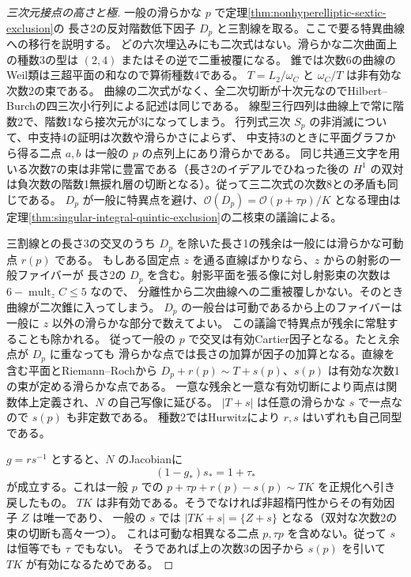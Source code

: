 \begin{proof}[三次元接点の高さと極]
一般の滑らかな $p$ で定理\ref{thm:nonhyperelliptic-sextic-exclusion}の
長さ2の反対階数低下因子 $D_p$ と三割線を取る。ここで要る特異曲線への移行を説明する。
どの六次埋込みにも二次式はない。滑らかな二次曲面上の種数3の型は $(2,4)$ またはその逆で二重被覆になる。
錐では次数6の曲線のWeil類は三超平面の和なので算術種数4である。
$T=L_2/\omega_C$ と $\omega_C/T$ は非有効な次数2の束である。
曲線の二次式がなく、全二次切断が十次元なのでHilbert--Burchの四三次小行列による記述は同じである。
線型三行四列は曲線上で常に階数2で、階数1なら接次元が3になってしまう。
行列式三次 $S_p$ の非消滅について、中支持4の証明は次数や滑らかさによらず、
中支持3のときに平面グラフから得る二点 $a,b$ は一般の $p$ の点列上にあり滑らかである。
同じ共通三文字を用いる次数7の束は非常に豊富である（長さ2のイデアルでひねった後の
$H^1$ の双対は負次数の階数1無捩れ層の切断となる）。従って三二次式の次数8との矛盾も同じである。
$D_p$ が一般に特異点を避け、$\mathcal O(D_p)=\mathcal O(p+\tau p)/K$ となる理由は
定理\ref{thm:singular-integral-quintic-exclusion}の二核束の議論による。

三割線との長さ3の交叉のうち $D_p$ を除いた長さ1の残余は一般には滑らかな可動点 $r(p)$ である。
もしある固定点 $z$ を通る直線ばかりなら、$z$ からの射影の一般ファイバーが
長さ2の $D_p$ を含む。射影平面を張る像に対し射影束の次数は $6-\operatorname{mult}_z C\le5$ なので、
分離性から二次曲線への二重被覆しかない。そのとき曲線が二次錐に入ってしまう。
$D_p$ の一般台は可動であるから上のファイバーは一般に $z$ 以外の滑らかな部分で数えてよい。
この議論で特異点が残余に常駐することも除かれる。
従って一般の $p$ で交叉は有効Cartier因子となる。たとえ余点が $D_p$ に重なっても
滑らかな点では長さの加算が因子の加算となる。直線を含む平面とRiemann--Rochから
$D_p+r(p)\sim T+s(p)$、$s(p)$ は有効な次数1の束が定める滑らかな点である。
一意な残余と一意な有効切断により両点は関数体上定義され、$N$ の自己写像に延びる。
$|T+s|$ は任意の滑らかな $s$ で一点なので $s(p)$ も非定数である。
種数2ではHurwitzにより $r,s$ はいずれも自己同型である。

$g=rs^{-1}$ とすると、$N$ のJacobianに
\[
                  (1-g_*)s_*=1+\tau_*
\]
が成立する。これは一般 $p$ での $p+\tau p+r(p)-s(p)\sim T K$ を正規化へ引き戻したもの。
$T K$ は非有効である。そうでなければ非超楕円性からその有効因子 $Z$ は唯一であり、
一般の $s$ では $|T K+s|=\{Z+s\}$ となる（双対な次数2の束の切断も高々一つ）。
これは可動な相異なる二点 $p,\tau p$ を含めない。従って $s$ は恒等でも $\tau$ でもない。
そうであれば上の次数3の因子から $s(p)$ を引いて $T K$ が有効になるためである。


\end{proof}
